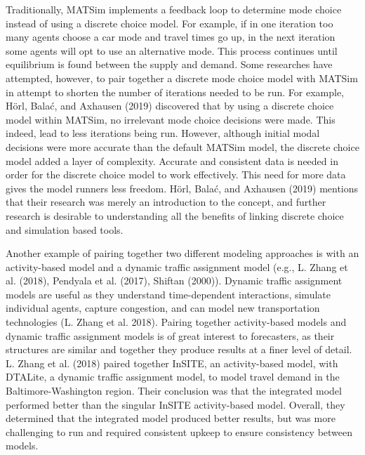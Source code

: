 \documentclass[12pt, oneside, openright]{byuthesis}
\begin{document}
Traditionally, MATSim implements a feedback loop to determine mode choice instead of using a discrete choice model. For example, if in one iteration too many agents choose a car mode and travel times go up, in the next iteration some agents will opt to use an alternative mode. This process continues until equilibrium is found between the supply and demand. Some researches have attempted, however, to pair together a discrete mode choice model with MATSim in attempt to shorten the number of iterations needed to be run. For example, Hörl, Balać, and Axhausen (2019) discovered that by using a discrete choice model within MATSim, no irrelevant mode choice decisions were made. This indeed, lead to less iterations being run. However, although initial modal decisions were more accurate than the default MATSim model, the discrete choice model added a layer of complexity. Accurate and consistent data is needed in order for the discrete choice model to work effectively. This need for more data gives the model runners less freedom. Hörl, Balać, and Axhausen (2019) mentions that their research was merely an introduction to the concept, and further research is desirable to understanding all the benefits of linking discrete choice and simulation based tools.

Another example of pairing together two different modeling approaches is with an activity-based model and a dynamic traffic assignment model (e.g., L. Zhang et al. (2018), Pendyala et al. (2017), Shiftan (2000)). Dynamic traffic assignment models are useful as they understand time-dependent interactions, simulate individual agents, capture congestion, and can model new transportation technologies (L. Zhang et al. 2018). Pairing together activity-based models and dynamic traffic assignment models is of great interest to forecasters, as their structures are similar and together they produce results at a finer level of detail. L. Zhang et al. (2018) paired together InSITE, an activity-based model, with DTALite, a dynamic traffic assignment model, to model travel demand in the Baltimore-Washington region. Their conclusion was that the integrated model performed better than the singular InSITE activity-based model. Overall, they determined that the integrated model produced better results, but was more challenging to run and required consistent upkeep to ensure consistency between models.
\end{document}
